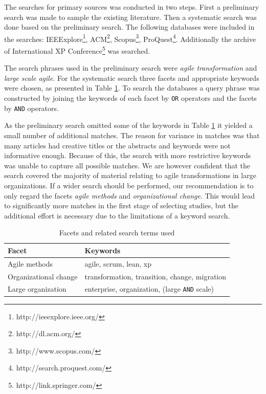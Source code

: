 \documentclass[lnbip]{svmultln}
\begin{document}
The searches for primary sources was conducted in two steps. First a preliminary
search was made to sample the existing literature. Then a systematic search was
done based on the preliminary search. The following databases were included in
the searches: IEEExplore\footnote{http://ieeexplore.ieee.org/},
ACM\footnote{http://dl.acm.org/}, Scopus\footnote{http://www.scopus.com/},
ProQuest\footnote{http://search.proquest.com/}.
Additionally the archive of International XP
Conference\footnote{http://link.springer.com/} was searched.

The search phrases used in the preliminary search were \textit{agile
transformation} and \textit{large scale agile}. For the systematic search three
facets and appropriate keywords were chosen, as presented in Table
\ref{table:searchterms}. To search the databases a query phrase was constructed
by joining the keywords of each facet by \texttt{OR} operators and the facets by
\texttt{AND} operators.

As the preliminary search omitted some of the keywords in Table
\ref{table:searchterms} it yielded a small number of additional matches. The
reason for variance in matches was that many articles had creative titles or the
abstracts and keywords were not informative enough. Because of this, the search
with more restrictive keywords was unable to capture all possible matches.
We are however confident that the search covered the majority of material
relating to agile transformations in large organizations. If a wider search
should be performed, our recommendation is to only regard the facets
\textit{agile methods} and \textit{organizational change}. This would lead to
significantly more matches in the first stage of selecting studies, but the
additional effort is necessary due to the limitations of a keyword search.

\begin{table}[h]
    \centering
    \begin{tabular}{ p{4cm} l }
        \toprule
        Facet                  & Keywords   \\ \midrule
        Agile methods          & agile, scrum, lean, xp \\ 
        Organizational change  & transformation, transition, change, migration \\
        Large organization     & enterprise, organization, (large \texttt{AND} scale) \\
        \bottomrule
    \end{tabular}
    \caption{Facets and related search terms used}
    \label{table:searchterms}
\end{table}
\end{document}
